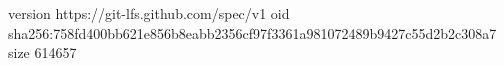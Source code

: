 version https://git-lfs.github.com/spec/v1
oid sha256:758fd400bb621e856b8eabb2356cf97f3361a981072489b9427c55d2b2c308a7
size 614657

